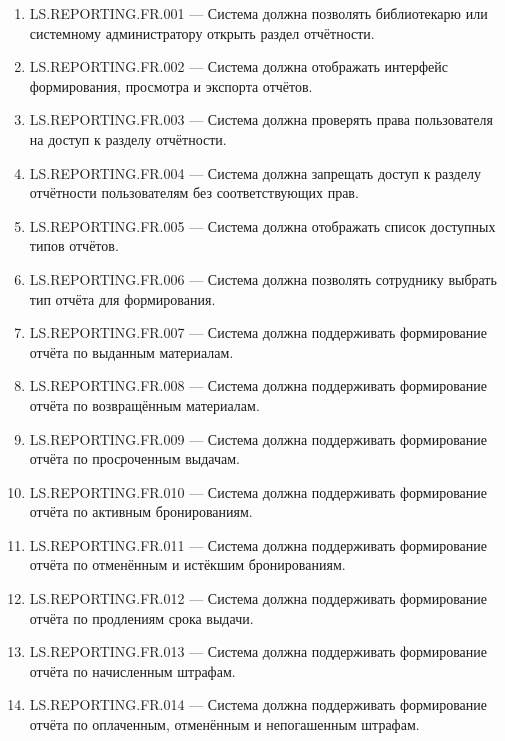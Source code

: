 \documentclass[12pt,a4paper]{article}
\begin{document}
	\begin{enumerate}
		\item LS.REPORTING.FR.001 --- Система должна позволять библиотекарю или
		системному администратору открыть раздел отчётности.
		
		\item LS.REPORTING.FR.002 --- Система должна отображать интерфейс формирования,
		просмотра и экспорта отчётов.
		
		\item LS.REPORTING.FR.003 --- Система должна проверять права пользователя на доступ
		к разделу отчётности.
		
		\item LS.REPORTING.FR.004 --- Система должна запрещать доступ к разделу отчётности
		пользователям без соответствующих прав.
		
		\item LS.REPORTING.FR.005 --- Система должна отображать список доступных типов
		отчётов.
		
		\item LS.REPORTING.FR.006 --- Система должна позволять сотруднику выбрать тип
		отчёта для формирования.
		
		\item LS.REPORTING.FR.007 --- Система должна поддерживать формирование отчёта
		по выданным материалам.
		
		\item LS.REPORTING.FR.008 --- Система должна поддерживать формирование отчёта
		по возвращённым материалам.
		
		\item LS.REPORTING.FR.009 --- Система должна поддерживать формирование отчёта
		по просроченным выдачам.
		
		\item LS.REPORTING.FR.010 --- Система должна поддерживать формирование отчёта
		по активным бронированиям.
		
		\item LS.REPORTING.FR.011 --- Система должна поддерживать формирование отчёта
		по отменённым и истёкшим бронированиям.
		
		\item LS.REPORTING.FR.012 --- Система должна поддерживать формирование отчёта
		по продлениям срока выдачи.
		
		\item LS.REPORTING.FR.013 --- Система должна поддерживать формирование отчёта
		по начисленным штрафам.
		
		\item LS.REPORTING.FR.014 --- Система должна поддерживать формирование отчёта
		по оплаченным, отменённым и непогашенным штрафам.
		

\end{enumerate}
\end{document}
